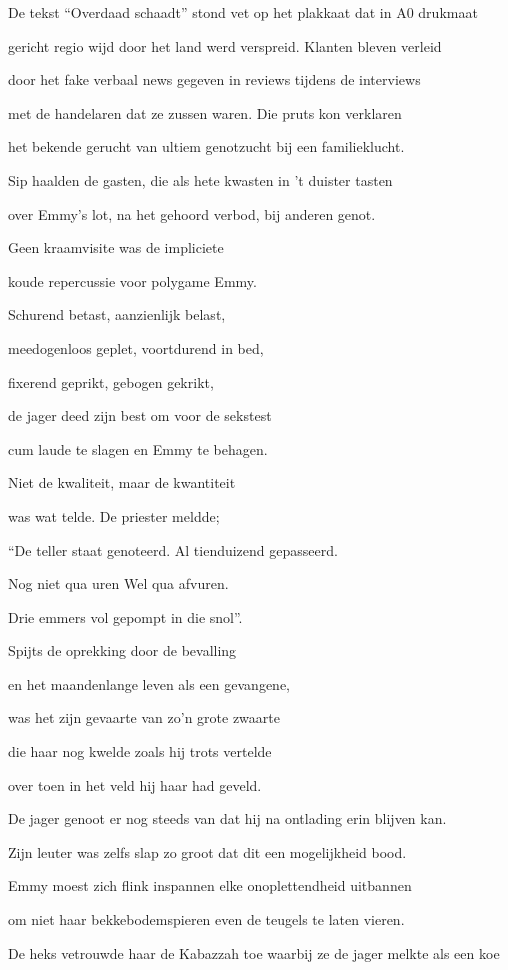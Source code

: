 De tekst “Overdaad schaadt”
stond vet op het plakkaat
dat in A0 drukmaat

gericht regio wijd
door het land werd verspreid.
Klanten bleven verleid

door het fake verbaal news
gegeven in reviews
tijdens de interviews

met de handelaren
dat ze zussen waren.
Die pruts kon verklaren

het bekende gerucht
van ultiem genotzucht
bij een familieklucht.

Sip haalden de gasten,
die als hete kwasten
in 't duister tasten

over Emmy’s lot,
na het gehoord verbod,
bij anderen genot.

Geen kraamvisite
was de impliciete

koude repercussie
voor polygame Emmy.

Schurend betast,
aanzienlijk belast,

meedogenloos geplet,
voortdurend in bed,

fixerend geprikt,
gebogen gekrikt,

de jager deed zijn best
om voor de sekstest

cum laude te slagen
en Emmy te behagen.

Niet de kwaliteit,
maar de kwantiteit

was wat telde.
De priester meldde;

“De teller staat genoteerd.
Al tienduizend gepasseerd.

Nog niet qua uren
Wel qua afvuren.

Drie emmers vol
gepompt in die snol”.

Spijts de oprekking
door de bevalling

en het maandenlange
leven als een gevangene,

was het zijn gevaarte
van zo’n grote zwaarte

die haar nog kwelde
zoals hij trots vertelde

over toen in het veld
hij haar had geveld.

De jager genoot er nog steeds van
dat hij na ontlading erin blijven kan.

Zijn leuter was zelfs slap zo groot
dat dit een mogelijkheid bood.

Emmy moest zich flink inspannen
elke onoplettendheid uitbannen

om niet haar bekkebodemspieren
even de teugels te laten vieren.

De heks vetrouwde haar de Kabazzah toe
waarbij ze de jager melkte als een koe

